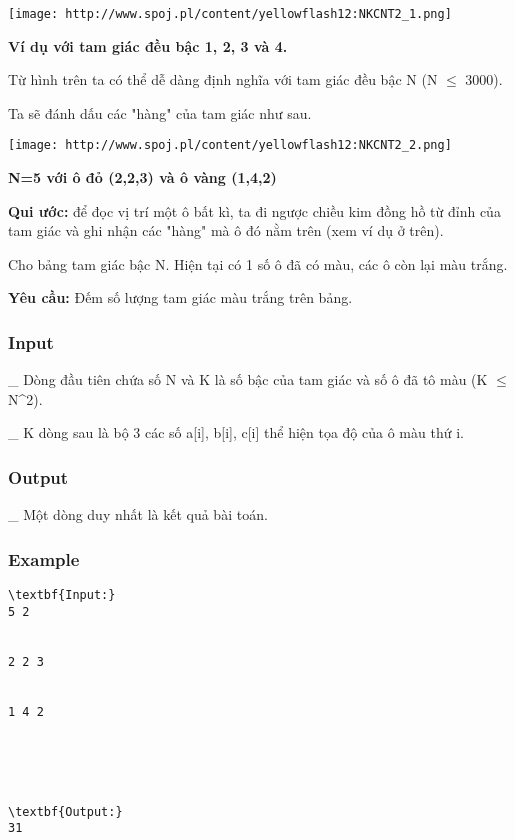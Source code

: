 




\texttt{[image: http://www.spoj.pl/content/yellowflash12:NKCNT2\_1.png]}

\textbf{    Ví dụ với tam giác đều bậc 1, 2, 3 và 4.   }

   Từ hình trên ta có thể dễ dàng định nghĩa với tam giác đều bậc N (N  $\le$  3000).  

   Ta sẽ đánh dấu các "hàng" của tam giác như sau.  


\texttt{[image: http://www.spoj.pl/content/yellowflash12:NKCNT2\_2.png]}

\textbf{    N=5 với ô đỏ (2,2,3) và ô vàng (1,4,2)   }

\textbf{    Qui ước:   }   để đọc vị trí một ô bất kì, ta đi ngược chiều kim đồng hồ từ đỉnh của tam giác và ghi nhận các "hàng" mà ô đó nằm trên (xem ví dụ ở trên).  

   Cho bảng tam giác bậc N. Hiện tại có 1 số ô đã có màu, các ô còn lại màu trắng.  

\textbf{    Yêu cầu:   }   Đếm số lượng tam giác màu trắng trên bảng.  

\subsubsection{   Input  }

   \_ Dòng đầu tiên chứa số N và K là số bậc của tam giác và số ô đã tô màu (K  $\le$  N^2).  

   \_ K dòng sau là bộ 3 các số a[i], b[i], c[i] thể hiện tọa độ của ô màu thứ i.  

\subsubsection{   Output  }

   \_ Một dòng duy nhất là kết quả bài toán.  

\subsubsection{   Example  }
\begin{verbatim}
\textbf{Input:}
5 2


2 2 3


1 4 2





\textbf{Output:}
31
\end{verbatim}
